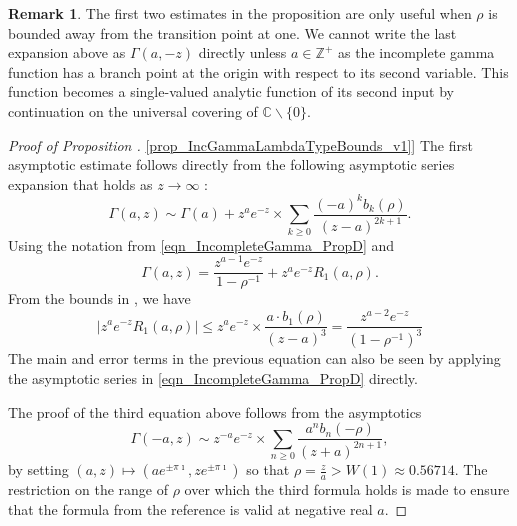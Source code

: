 \documentclass[11pt,reqno,a4letter]{article}
\newcommand{\hlocalref}[1]{\hyperref[#1]{\ref{#1}}}
\numberwithin{equation}{section}
\numberwithin{figure}{section}
\numberwithin{table}{section}
\theoremstyle{plain}
\numberwithin{theorem}{section}
\theoremstyle{definition}
\newtheorem{remark}[theorem]{Remark}
\begin{document}
\begin{remark}
The first two estimates in the proposition 
are only useful when $\rho$ is bounded away from the transition point at one. 
We cannot write the last expansion above 
as $\Gamma(a, -z)$ directly unless $a \in \mathbb{Z}^{+}$ 
as the incomplete gamma function 
has a branch point at the origin with respect to its second variable. 
This function becomes a single-valued 
analytic function of its second input by continuation 
on the universal covering of $\mathbb{C} \mathbin{\backslash} \{0\}$. 
\end{remark}

\begin{proof}[Proof of Proposition \hlocalref{prop_IncGammaLambdaTypeBounds_v1}] 
The first asymptotic estimate follows directly from the following 
asymptotic series expansion that holds as $z \rightarrow \infty$ 
\cite[Eq.\ (2.1)]{NEMES2019}: 
\[
\Gamma(a, z) \sim \Gamma(a) + z^a e^{-z} \times \sum_{k \geq 0} 
     \frac{(-a)^k b_k(\rho)}{(z-a)^{2k+1}}. 
\]
Using the notation from \eqref{eqn_IncompleteGamma_PropD} and \cite{NEMES2016} 
\[
\Gamma(a, z) = \frac{z^{a-1} e^{-z}}{1-\rho^{-1}} + z^{a} e^{-z} R_1(a, \rho). 
\]
From the bounds in \cite[\S 3.1]{NEMES2016}, we have 
\[
\left\lvert z^{a} e^{-z} R_1(a, \rho) \right\rvert \leq 
     z^a e^{-z} \times \frac{a \cdot b_1(\rho)}{(z-a)^{3}} = 
     \frac{z^{a-2} e^{-z}}{(1-\rho^{-1})^{3}}
\]
The main and error terms in the previous equation can also be 
seen by applying the asymptotic series in 
\eqref{eqn_IncompleteGamma_PropD} directly. 

The proof of the third equation above follows from the asymptotics 
\cite[Eq.\ (1.1)]{NEMES2015C}
\[
\Gamma(-a, z) \sim z^{-a} e^{-z} \times \sum_{n \geq 0} \frac{a^n b_n(-\rho)}{(z+a)^{2n+1}}, 
\]
by setting $(a, z) \mapsto \left(a e^{\pm \pi\imath}, z e^{\pm \pi\imath}\right)$ so that 
$\rho = \frac{z}{a} > W(1) \approx 0.56714$. 
The restriction on the range of $\rho$ over which the third formula holds is made to ensure that 
the formula from the reference is valid at negative real $a$. 
\end{proof}
\end{document}
